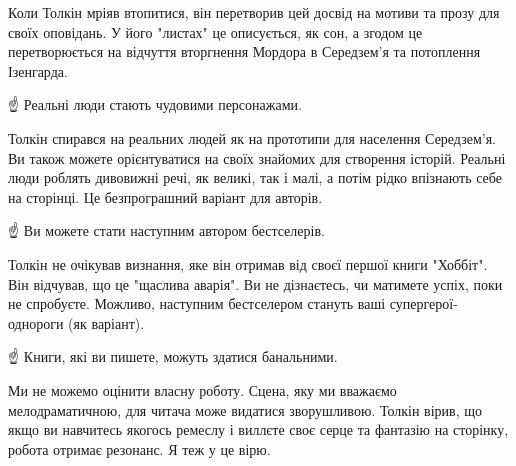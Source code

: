 Коли Толкін мріяв втопитися, він перетворив цей досвід на мотиви та прозу для
своїх оповідань. У його "листах" це описується, як сон, а згодом це
перетворюється на відчуття вторгнення Мордора в Середзем’я та потоплення
Ізенгарда.

☝️ Реальні люди стають чудовими персонажами.

Толкін спирався на реальних людей як на прототипи для населення Середзем’я. Ви
також можете орієнтуватися на своїх знайомих для створення історій. Реальні
люди роблять дивовижні речі, як великі, так і малі, а потім рідко впізнають
себе на сторінці. Це безпрограшний варіант для авторів.

☝️ Ви можете стати наступним автором бестселерів.

Толкін не очікував визнання, яке він отримав від своєї першої книги "Хоббіт".
Він відчував, що це "щаслива аварія". Ви не дізнаєтесь, чи матимете успіх, поки
не спробуєте. Можливо, наступним бестселером стануть ваші супергерої-однороги
(як варіант).

☝️ Книги, які ви пишете, можуть здатися банальними.

Ми не можемо оцінити власну роботу. Сцена, яку ми вважаємо мелодраматичною, для
читача може видатися зворушливою. Толкін вірив, що якщо ви навчитесь якогось
ремеслу і виллєте своє серце та фантазію на сторінку, робота отримає резонанс.
Я теж у це вірю.
